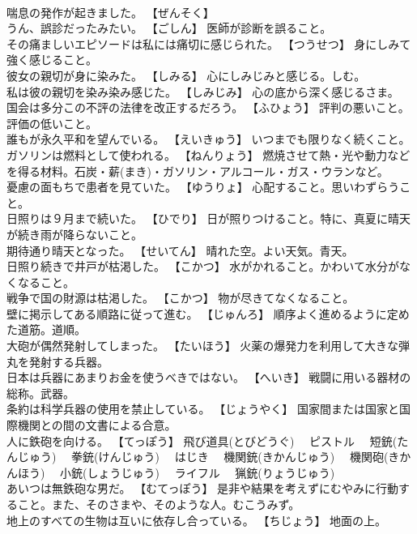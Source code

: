 \documentclass[8pt]{extreport}
\begin{document}
\begin{CJK}{UTF8}{min}
\\	喘息の発作が起きました。	【ぜんそく】 
\\	うん、誤診だったみたい。	【ごしん】 医師が診断を誤ること。
\\	その痛ましいエピソードは私には痛切に感じられた。	【つうせつ】 身にしみて強く感じること。
\\	彼女の親切が身に染みた。	【しみる】 心にしみじみと感じる。しむ。
\\	私は彼の親切を染み染み感じた。	【しみじみ】 心の底から深く感じるさま。
\\	国会は多分この不評の法律を改正するだろう。	【ふひょう】 評判の悪いこと。評価の低いこと。
\\	誰もが永久平和を望んでいる。	【えいきゅう】 いつまでも限りなく続くこと。
\\	ガソリンは燃料として使われる。	【ねんりょう】 燃焼させて熱・光や動力などを得る材料。石炭・薪(まき)・ガソリン・アルコール・ガス・ウランなど。
\\	憂慮の面もちで患者を見ていた。	【ゆうりょ】 心配すること。思いわずらうこと。
\\	日照りは９月まで続いた。	【ひでり】 日が照りつけること。特に、真夏に晴天が続き雨が降らないこと。
\\	期待通り晴天となった。	【せいてん】 晴れた空。よい天気。青天。
\\	日照り続きで井戸が枯渇した。	【こかつ】 水がかれること。かわいて水分がなくなること。
\\	戦争で国の財源は枯渇した。	【こかつ】 物が尽きてなくなること。
\\	壁に掲示してある順路に従って進む。	【じゅんろ】 順序よく進めるように定めた道筋。道順。
\\	大砲が偶然発射してしまった。	【たいほう】 火薬の爆発力を利用して大きな弾丸を発射する兵器。
\\	日本は兵器にあまりお金を使うべきではない。	【へいき】 戦闘に用いる器材の総称。武器。
\\	条約は科学兵器の使用を禁止している。	【じょうやく】 国家間または国家と国際機関との間の文書による合意。
\\	人に鉄砲を向ける。	【てっぽう】 飛び道具(とびどうぐ)　 ピストル　 短銃(たんじゅう)　 拳銃(けんじゅう)　 はじき　 機関銃(きかんじゅう)　 機関砲(きかんほう)　 小銃(しょうじゅう)　 ライフル　 猟銃(りょうじゅう)
\\	あいつは無鉄砲な男だ。	【むてっぽう】 是非や結果を考えずにむやみに行動すること。また、そのさまや、そのような人。むこうみず。
\\	地上のすべての生物は互いに依存し合っている。	【ちじょう】 地面の上。

\end{CJK}
\end{document}
